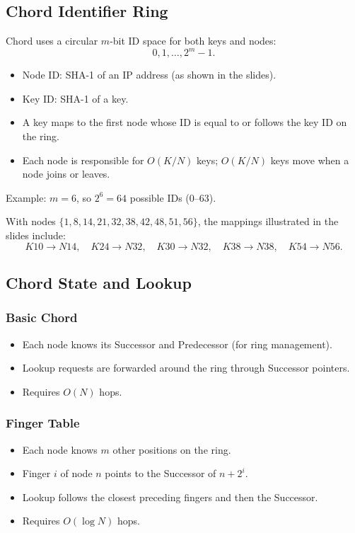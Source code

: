 \documentclass{article}
\begin{document}
\subsection{Chord Identifier Ring}

Chord uses a circular \(m\)-bit ID space for both keys and nodes:
\[
0,1,\ldots,2^m-1.
\]

\begin{itemize}
    \item Node ID: SHA-1 of an IP address (as shown in the slides).
    \item Key ID: SHA-1 of a key.
    \item A key maps to the first node whose ID is equal to or follows the key ID on the ring.
    \item Each node is responsible for \(O(K/N)\) keys; \(O(K/N)\) keys move when a node joins or leaves.
\end{itemize}

Example: \(m=6\), so \(2^6=64\) possible IDs (0--63).

With nodes \(\{1,8,14,21,32,38,42,48,51,56\}\), the mappings illustrated in the slides include:
\[
K10\to N14,\quad K24\to N32,\quad K30\to N32,\quad
K38\to N38,\quad K54\to N56.
\]

\subsection{Chord State and Lookup}

\subsubsection{Basic Chord}
\begin{itemize}
    \item Each node knows its Successor and Predecessor (for ring management).
    \item Lookup requests are forwarded around the ring through Successor pointers.
    \item Requires \(O(N)\) hops.
\end{itemize}

\subsubsection{Finger Table}
\begin{itemize}
    \item Each node knows \(m\) other positions on the ring.
    \item Finger \(i\) of node \(n\) points to the Successor of \(n+2^i\).
    \item Lookup follows the closest preceding fingers and then the Successor.
    \item Requires \(O(\log N)\) hops.
\end{itemize}
\end{document}
